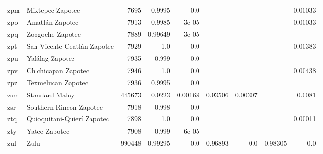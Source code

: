 \documentclass[11pt]{article}
\begin{document}
\begin{table*}[h]
{\begin{tabular}{llrrrrrrr}
zpm         & Mixtepec Zapotec         & 7695         & 0.9995         & 0.0         &          &          &          & 0.00033         \\

zpo         & Amatlán Zapotec         & 7913         & 0.9985         & 3e-05         &          &          &          & 0.00033         \\

zpq         & Zoogocho Zapotec         & 7889         & 0.99649         & 3e-05         &          &          &          &          \\

zpt         & San Vicente Coatlán Zapotec         & 7929         & 1.0         & 0.0         &          &          &          & 0.00383         \\

zpu         & Yalálag Zapotec         & 7935         & 0.999         & 0.0         &          &          &          &          \\

zpv         & Chichicapan Zapotec         & 7946         & 1.0         & 0.0         &          &          &          & 0.00438         \\

zpz         & Texmelucan Zapotec         & 7936         & 0.9995         & 0.0         &          &          &          &          \\

zsm         & Standard Malay         & 445673         & 0.9223         & 0.00168         & 0.93506         & 0.00307         &          & 0.0081         \\

zsr         & Southern Rincon Zapotec         & 7918         & 0.998         & 0.0         &          &          &          &          \\

ztq         & Quioquitani-Quierí Zapotec         & 7898         & 1.0         & 0.0         &          &          &          & 0.00011         \\

zty         & Yatee Zapotec         & 7908         & 0.999         & 6e-05         &          &          &          &          \\

zul         & Zulu         & 990448         & 0.99295         & 0.0         & 0.96893         & 0.0         & 0.98305         & 0.0         \\


\end{tabular}}
\end{table*}
\end{document}

